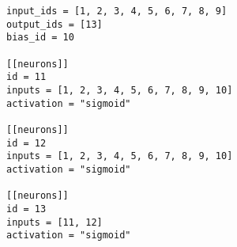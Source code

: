\begin{lstlisting}[label=verb:cmaes_proben1_config,caption=CMA-ES Proben1 Cancer1 configuration (2 hidden neurons)]
input_ids = [1, 2, 3, 4, 5, 6, 7, 8, 9]
output_ids = [13]
bias_id = 10

[[neurons]]
id = 11
inputs = [1, 2, 3, 4, 5, 6, 7, 8, 9, 10]
activation = "sigmoid"

[[neurons]]
id = 12
inputs = [1, 2, 3, 4, 5, 6, 7, 8, 9, 10]
activation = "sigmoid"

[[neurons]]
id = 13
inputs = [11, 12]
activation = "sigmoid"
\end{lstlisting}
